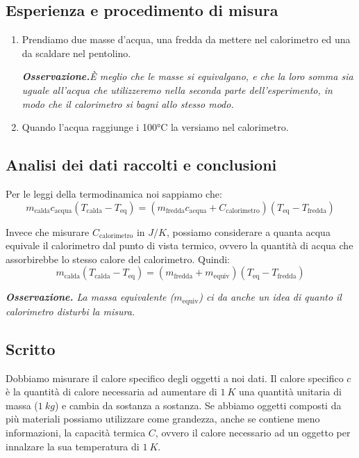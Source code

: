\documentclass{article}
\begin{document}
\subsection{Esperienza e procedimento di misura}
    
\begin{enumerate}
    \item
        Prendiamo due masse d'acqua, una fredda da mettere nel calorimetro ed una da
        scaldare nel pentolino. 
        
    \emph{
        \textbf{Osservazione.}È meglio che le masse si equivalgano, e che la loro
        somma sia uguale all'acqua che utilizzeremo nella seconda parte dell'esperimento,
        in modo che il calorimetro si bagni allo stesso modo.
        }
        
    \item
        Quando l'acqua raggiunge i 100°C la versiamo nel calorimetro.
\end{enumerate}
        
\subsection{Analisi dei dati raccolti e conclusioni}
Per le leggi della termodinamica noi sappiamo che:
    \[
        m_\text{calda} c_\text{acqua} (T_\text{calda}-T_\text{eq}) =
        (m_\text{fredda} c_\text{acqua} + C_\text{calorimetro})(T_\text{eq}-T_\text{fredda})
    \]

Invece che misurare $C_\text{calorimetro}$ in $\unit{J\per K}$, possiamo considerare a
quanta acqua equivale il calorimetro dal punto di vista termico, ovvero la quantità di
acqua che assorbirebbe lo stesso calore del calorimetro. Quindi:
    \[
        m_\text{calda} (T_\text{calda}-T_\text{eq}) =
        (m_\text{fredda} + m_\text{equiv})(T_\text{eq}-T_\text{fredda})
    \]

    \emph{
        \textbf{Osservazione.} La massa equivalente ($m_\text{equiv}$) ci da anche un idea di
        quanto il calorimetro disturbi la misura.
        }


\subsection{Scritto}
    Dobbiamo misurare il calore specifico degli oggetti a noi dati. Il calore
    specifico $c$ è la quantità di calore necessaria ad aumentare di $\qty{1}{K}$ una
    quantità unitaria di massa ($\qty{1}{kg}$) e cambia da sostanza a sostanza.
    Se abbiamo oggetti composti da più materiali possiamo utilizzare come grandezza,
    anche se contiene meno informazioni, la capacità termica $C$, ovvero il calore
    necessario ad un oggetto per innalzare la sua temperatura di $\qty{1}{K}$.
\end{document}
